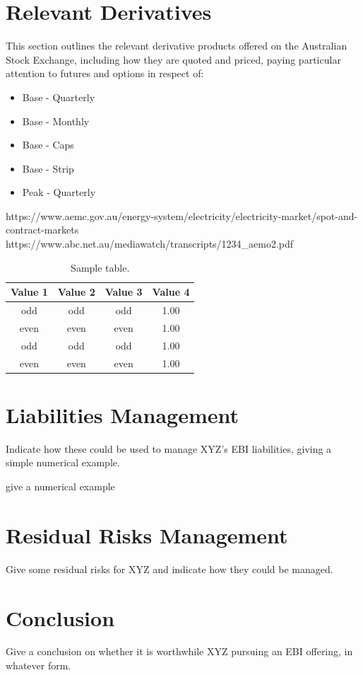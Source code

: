 \documentclass[12pt]{article}
\begin{document}
\section{Relevant Derivatives}
This section outlines the relevant derivative products offered on the Australian Stock Exchange, including how they are quoted and priced, paying particular attention to futures and options in respect of: 
\begin{itemize}
 \item Base - Quarterly
 \item Base - Monthly
 \item Base - Caps
 \item Base - Strip
 \item Peak - Quarterly
\end{itemize}

\begin{flushleft}
https://www.aemc.gov.au/energy-system/electricity/electricity-market/spot-and-contract-markets
https://www.abc.net.au/mediawatch/transcripts/1234_aemo2.pdf
\end{flushleft}

\begin{table}[!h]
\centering
\caption{Sample table.}
\begin{tabular}{cccc}
\toprule
Value 1 & Value 2 & Value 3 & Value 4\\
\midrule
 odd     & odd   & odd & 1.00 \\
 even    & even  & even& 1.00 \\
 odd     & odd   & odd & 1.00 \\
 even    & even  & even& 1.00 \\
\bottomrule
\end{tabular}
\end{table}

\section{Liabilities Management}
Indicate how these could be used to manage XYZ’s EBI liabilities, giving a simple numerical example. \par

give a numerical example
\frameboxend

\section{Residual Risks Management}
Give some residual risks for XYZ and indicate how they could be managed. 

\section{Conclusion}
Give a conclusion on whether it is worthwhile XYZ pursuing an EBI offering, in whatever form. 
\newpage
\printbibliography[heading=bibintoc]
\end{document}
